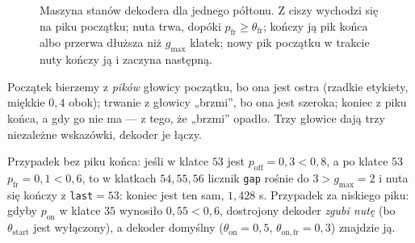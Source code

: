 \begin{figure}[ht]
\centering
{}
\caption{Maszyna stanów dekodera dla jednego półtonu. Z ciszy wychodzi się na piku początku; nuta trwa, dopóki $p_\mathrm{fr}\ge\theta_\mathrm{fr}$; kończy ją pik końca albo przerwa dłuższa niż $g_\mathrm{max}$ klatek; nowy pik początku w trakcie nuty kończy ją i zaczyna następną.}
\label{rys:dekoder-stany}
\end{figure}

\begin{intuicja}
Początek bierzemy z \emph{pików} głowicy początku, bo ona jest ostra (rzadkie etykiety, miękkie $0{,}4$ obok); trwanie z głowicy „brzmi”, bo ona jest szeroka; koniec z piku końca, a gdy go nie ma --- z tego, że „brzmi” opadło. Trzy głowice dają trzy niezależne wskazówki, dekoder je łączy.
\end{intuicja}

\begin{naliczbach}
Przypadek bez piku końca: jeśli w klatce $53$ jest $p_\mathrm{off}=0{,}3<0{,}8$, a po klatce $53$ $p_\mathrm{fr}=0{,}1<0{,}6$, to w klatkach $54,55,56$ licznik \texttt{gap} rośnie do $3>g_\mathrm{max}=2$ i nuta się kończy z \texttt{last}$=53$: koniec jest ten sam, $1{,}428$ s.
Przypadek za niskiego piku: gdyby $p_\mathrm{on}$ w klatce $35$ wynosiło $0{,}55<0{,}6$, dostrojony dekoder \emph{zgubi nutę} (bo $\theta_\mathrm{start}$ jest wyłączony), a dekoder domyślny ($\theta_\mathrm{on}=0{,}5$, $\theta_\mathrm{on,fr}=0{,}3$) znajdzie ją.
\end{naliczbach}

